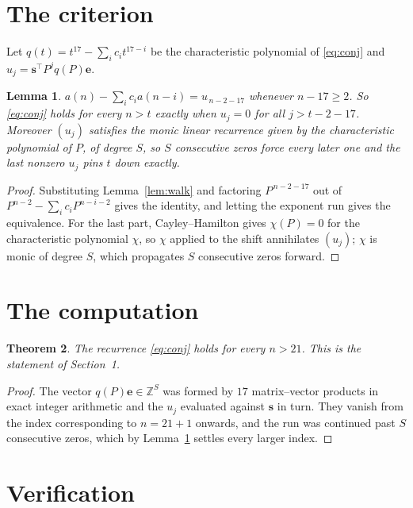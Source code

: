 \documentclass[11pt,a4paper]{article}
\theoremstyle{plain}
\newtheorem{theorem}{Theorem}
\newtheorem{lemma}[theorem]{Lemma}
\theoremstyle{definition}
\begin{document}
\section{The criterion}

Let $q(t)=t^{17}-\sum_i c_i t^{17-i}$ be the characteristic polynomial of
\eqref{eq:conj} and $u_j=\mathbf{s}^{\!\top}P^{j}q(P)\mathbf{e}$.

\begin{lemma}\label{lem:crit}
$a(n)-\sum_i c_i a(n-i)=u_{\,n-2-17}$ whenever $n-17\ge2$. So \eqref{eq:conj}
holds for every $n>t$ exactly when $u_j=0$ for all $j>t-2-17$. Moreover $(u_j)$
satisfies the monic linear recurrence given by the characteristic polynomial of $P$, of
degree $S$, so $S$ consecutive zeros force every later one and the last nonzero $u_j$ pins
$t$ down exactly.
\end{lemma}

\begin{proof}
Substituting Lemma~\ref{lem:walk} and factoring $P^{\,n-2-17}$ out of
$P^{n-2}-\sum_i c_i P^{n-i-2}$ gives the identity, and letting the exponent run gives the
equivalence. For the last part, Cayley--Hamilton gives $\chi(P)=0$ for the characteristic
polynomial $\chi$, so $\chi$ applied to the shift annihilates $(u_j)$; $\chi$ is monic of
degree $S$, which propagates $S$ consecutive zeros forward.
\end{proof}

\section{The computation}

\begin{theorem}
The recurrence \eqref{eq:conj} holds for every $n>21$. This is the statement of
Section~1.
\end{theorem}

\begin{proof}
The vector $q(P)\mathbf{e}\in\mathbb{Z}^{S}$ was formed by $17$ matrix--vector
products in exact integer arithmetic and the $u_j$ evaluated against $\mathbf{s}$ in turn.
They vanish from the index corresponding to $n=21+1$ onwards, and the run was continued
past $S$ consecutive zeros, which by Lemma~\ref{lem:crit} settles every larger index.
\end{proof}

\section{Verification}
\end{document}
